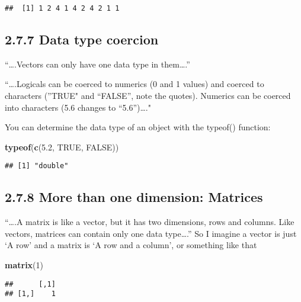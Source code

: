 \documentclass[]{article}
\newenvironment{Shaded}{\begin{snugshade}}{\end{snugshade}}
\newcommand{\DecValTok}[1]{\textcolor[rgb]{0.00,0.00,0.81}{#1}}
\newcommand{\FloatTok}[1]{\textcolor[rgb]{0.00,0.00,0.81}{#1}}
\newcommand{\KeywordTok}[1]{\textcolor[rgb]{0.13,0.29,0.53}{\textbf{#1}}}
\newcommand{\NormalTok}[1]{#1}
\newcommand{\OtherTok}[1]{\textcolor[rgb]{0.56,0.35,0.01}{#1}}
\begin{document}
\begin{verbatim}
##  [1] 1 2 4 1 4 2 4 2 1 1
\end{verbatim}

\hypertarget{data-type-coercion}{%
\subsection{2.7.7 Data type coercion}\label{data-type-coercion}}

``\ldots{}.Vectors can only have one data type in them\ldots{}.''

``\ldots{}.Logicals can be coerced to numerics (0 and 1 values) and
coerced to characters (''TRUE" and ``FALSE'', note the quotes). Numerics
can be coerced into characters (5.6 changes to ``5.6'')\ldots{}."

You can determine the data type of an object with the typeof() function:

\begin{Shaded}
\begin{Highlighting}[]
\KeywordTok{typeof}\NormalTok{(}\KeywordTok{c}\NormalTok{(}\FloatTok{5.2}\NormalTok{, }\OtherTok{TRUE}\NormalTok{, }\OtherTok{FALSE}\NormalTok{))}
\end{Highlighting}
\end{Shaded}

\begin{verbatim}
## [1] "double"
\end{verbatim}

\hypertarget{more-than-one-dimension-matrices}{%
\subsection{2.7.8 More than one dimension:
Matrices}\label{more-than-one-dimension-matrices}}

``\ldots{}.A matrix is like a vector, but it has two dimensions, rows
and columns. Like vectors, matrices can contain only one data
type\ldots{}.'' So I imagine a vector is just `A row' and a matrix is `A
row and a column', or something like that

\begin{Shaded}
\begin{Highlighting}[]
\KeywordTok{matrix}\NormalTok{(}\DecValTok{1}\NormalTok{)}
\end{Highlighting}
\end{Shaded}

\begin{verbatim}
##      [,1]
## [1,]    1
\end{verbatim}
\end{document}
